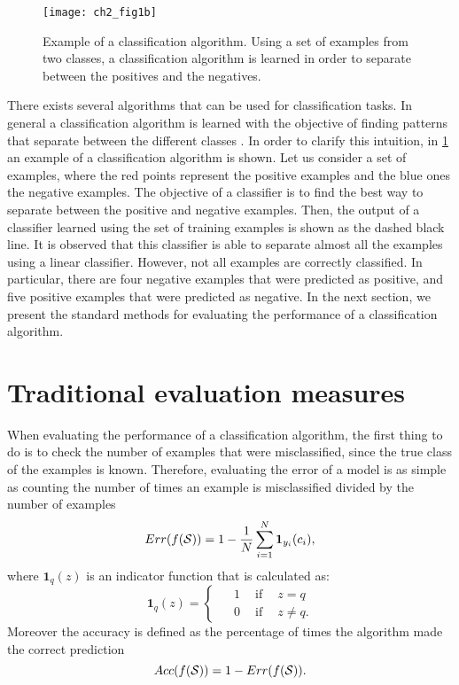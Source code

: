 \begin{figure}[!t]
\centering
\texttt{[image: ch2\_fig1b]}
\caption{Example of a classification algorithm. Using a set of examples from two classes, a 
	classification algorithm is learned in order to separate between the positives and the negatives. 
}
\label{fig:2:2}
\end{figure} 

There exists several algorithms that can be used for classification tasks. In general a 
classification algorithm is learned with the objective of finding patterns that separate between 
the different classes \citep{Hastie2009}. In order to clarify this intuition, in \figurename{ 
\ref{fig:2:2}} an example of a classification algorithm is shown. Let us consider a set of 
examples, where the red points represent the positive examples and the blue ones the negative 
examples. The objective of a classifier is to find the best way to separate between the positive and 
negative examples. Then, the output of a classifier learned using the set of training examples is 
shown as the dashed black line. It is observed that this classifier is able to separate almost all 
the examples using a linear classifier. However, not all examples are correctly classified. In 
particular, there are four negative examples that were predicted as positive, and five positive 
examples that were predicted as negative. In the next section, we present the standard methods for 
evaluating the performance of a classification algorithm.


\section{Traditional evaluation measures}
\label{sec:2:measures}

When evaluating the performance of a classification algorithm, the first thing to do is to check 
the number of examples that were misclassified, since the true class of the examples 
is known. Therefore, evaluating the error of a model is as simple as counting the number of times 
an example is misclassified divided by the number of examples
\begin{equation}\label{eqn:ch2:error}
Err(f({\cal S})) = 1 -\frac{1}{N}  \sum_{i=1}^N \mathbf{1}_{y_i}(c_i),
\end{equation}
where $\mathbf{1}_q(z)$ is an indicator function that is calculated as:
\begin{equation}
   \mathbf{1}_q(z) = 
  \begin{cases}
    \phantom{-}1 \phantom{-} \mbox{if} \phantom{-} z = q\\
    \phantom{-}0 \phantom{-} \mbox{if} \phantom{-} z \neq q.
  \end{cases}
\end{equation}
Moreover the accuracy is defined as the percentage of times the algorithm 
made the correct prediction
\begin{equation}\label{eqn:2:accuracy}
Acc(f({\cal S})) = 1- Err(f({\cal S})).
\end{equation}

